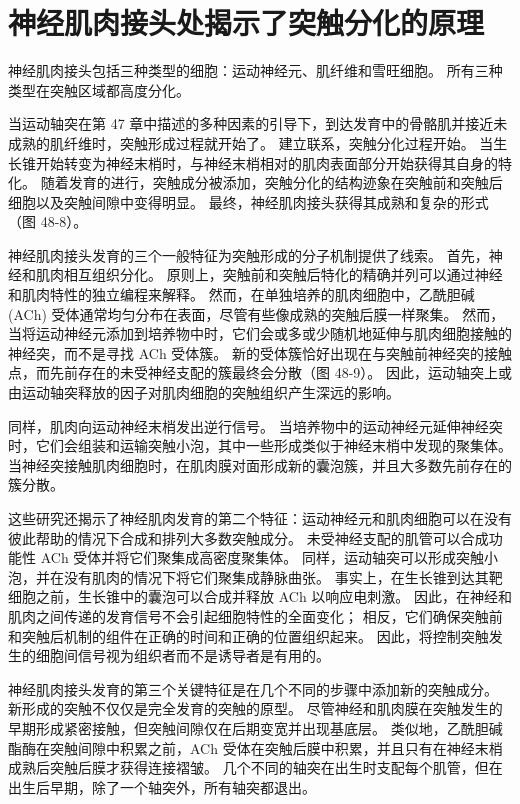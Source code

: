\section{神经肌肉接头处揭示了突触分化的原理}
神经肌肉接头包括三种类型的细胞：运动神经元、肌纤维和雪旺细胞。 所有三种类型在突触区域都高度分化。

当运动轴突在第 47 章中描述的多种因素的引导下，到达发育中的骨骼肌并接近未成熟的肌纤维时，突触形成过程就开始了。 建立联系，突触分化过程开始。 当生长锥开始转变为神经末梢时，与神经末梢相对的肌肉表面部分开始获得其自身的特化。 随着发育的进行，突触成分被添加，突触分化的结构迹象在突触前和突触后细胞以及突触间隙中变得明显。 最终，神经肌肉接头获得其成熟和复杂的形式（图 48-8）。

神经肌肉接头发育的三个一般特征为突触形成的分子机制提供了线索。 首先，神经和肌肉相互组织分化。 原则上，突触前和突触后特化的精确并列可以通过神经和肌肉特性的独立编程来解释。 然而，在单独培养的肌肉细胞中，乙酰胆碱 (ACh) 受体通常均匀分布在表面，尽管有些像成熟的突触后膜一样聚集。 然而，当将运动神经元添加到培养物中时，它们会或多或少随机地延伸与肌肉细胞接触的神经突，而不是寻找 ACh 受体簇。 新的受体簇恰好出现在与突触前神经突的接触点，而先前存在的未受神经支配的簇最终会分散（图 48-9）。 因此，运动轴突上或由运动轴突释放的因子对肌肉细胞的突触组织产生深远的影响。

同样，肌肉向运动神经末梢发出逆行信号。 当培养物中的运动神经元延伸神经突时，它们会组装和运输突触小泡，其中一些形成类似于神经末梢中发现的聚集体。 当神经突接触肌肉细胞时，在肌肉膜对面形成新的囊泡簇，并且大多数先前存在的簇分散。

这些研究还揭示了神经肌肉发育的第二个特征：运动神经元和肌肉细胞可以在没有彼此帮助的情况下合成和排列大多数突触成分。 未受神经支配的肌管可以合成功能性 ACh 受体并将它们聚集成高密度聚集体。 同样，运动轴突可以形成突触小泡，并在没有肌肉的情况下将它们聚集成静脉曲张。 事实上，在生长锥到达其靶细胞之前，生长锥中的囊泡可以合成并释放 ACh 以响应电刺激。 因此，在神经和肌肉之间传递的发育信号不会引起细胞特性的全面变化； 相反，它们确保突触前和突触后机制的组件在正确的时间和正确的位置组织起来。 因此，将控制突触发生的细胞间信号视为组织者而不是诱导者是有用的。

神经肌肉接头发育的第三个关键特征是在几个不同的步骤中添加新的突触成分。 新形成的突触不仅仅是完全发育的突触的原型。 尽管神经和肌肉膜在突触发生的早期形成紧密接触，但突触间隙仅在后期变宽并出现基底层。 类似地，乙酰胆碱酯酶在突触间隙中积累之前，ACh 受体在突触后膜中积累，并且只有在神经末梢成熟后突触后膜才获得连接褶皱。 几个不同的轴突在出生时支配每个肌管，但在出生后早期，除了一个轴突外，所有轴突都退出。

